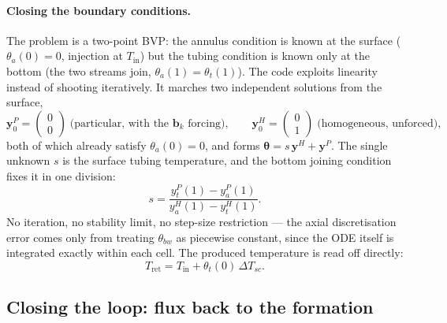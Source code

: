 \documentclass[11pt]{article}
\begin{document}
\paragraph{Closing the boundary conditions.}
The problem is a two-point BVP: the annulus condition is known at the surface
($\theta_a(0)=0$, injection at $T_{\mathrm{in}}$) but the tubing condition is
known only at the bottom (the two streams join, $\theta_a(1)=\theta_t(1)$). The
code exploits linearity instead of shooting iteratively. It marches two
independent solutions from the surface,
\begin{equation}
\mathbf{y}^{P}_0=\begin{pmatrix}0\\
0\end{pmatrix} \;\text{(particular, with the }\mathbf{b}_k\text{ forcing)}, \qquad
\mathbf{y}^{H}_0=\begin{pmatrix}0\\
1\end{pmatrix} \;\text{(homogeneous, unforced)},
\label{eq:dbhe:seeds}
\end{equation}
both of which already satisfy $\theta_a(0)=0$, and forms
$\boldsymbol{\theta}=s\,\mathbf{y}^{H}+\mathbf{y}^{P}$. The single unknown $s$
is the surface tubing temperature, and the bottom joining condition fixes it in
one division:
\begin{equation}
s=\frac{y^{P}_{t}(1)-y^{P}_{a}(1)}{y^{H}_{a}(1)-y^{H}_{t}(1)} .
\label{eq:dbhe:shoot}
\end{equation}
No iteration, no stability limit, no step-size restriction --- the axial
discretisation error comes only from treating $\theta_{bw}$ as piecewise
constant, since the ODE itself is integrated exactly within each cell. The
produced temperature is read off directly:
\begin{equation}
T_{\mathrm{ret}}=T_{\mathrm{in}}+\theta_t(0)\,\Delta T_{sc}.
\label{eq:dbhe:Tret}
\end{equation}

\subsection{Closing the loop: flux back to the formation}
\label{sec:dbhe:coupling}
\end{document}
